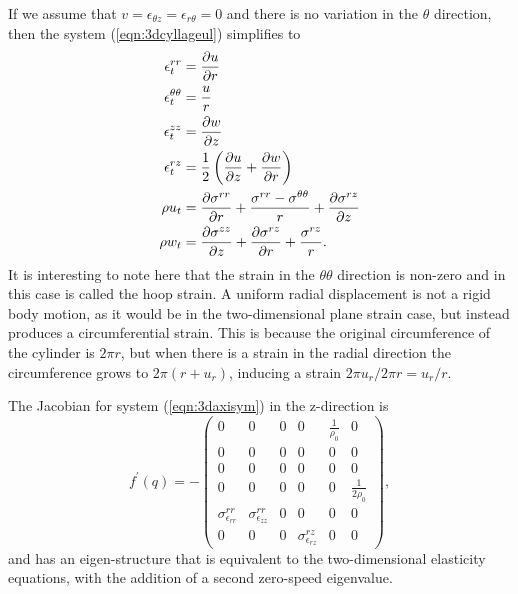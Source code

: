 \documentclass{article}
\begin{document}
If we assume that $v = \epsilon_{\theta z} = \epsilon_{r \theta} = 0$ and there is no variation in the $\theta
$ direction, then the system (\ref{eqn:3dcyllageul}) simplifies to
\begin{align}
\epsilon^{rr}_t &= \frac{\partial u}{\partial r}\notag\\
\epsilon^{\theta \theta}_t &= \frac{u}{r} \notag\\
\epsilon^{zz}_t &= \frac{\partial w}{\partial z}\notag\\
\epsilon^{rz}_t &= \frac{1}{2}\left(\frac{\partial u}{\partial z} + \frac{\partial w}{\partial r}\right)\label{eqn:3daxisym}\\
\rho u_t &= \frac{\partial \sigma^{rr}}{\partial r} + \frac{\sigma^{rr} - \sigma^{\theta \theta}}{r} + \frac{\partial 
\sigma^{rz}}{\partial z}\notag\\
\rho w_t &= \frac{\partial \sigma^{zz}}{\partial z} + \frac{\partial \sigma^{rz}}{\partial r} + \frac{\sigma^{rz}}
{r}.\notag
\end{align}
It is interesting to note here that the strain in the $\theta \theta$ direction is non-zero and in this case is 
called the hoop strain.  A uniform radial displacement is not a rigid body motion, as it would be in the 
two-dimensional plane strain case, but instead produces a circumferential strain.  This is because the 
original circumference of the cylinder is $2\pi r$, but when there is a strain in the radial direction the 
circumference grows to $2\pi (r + u_r)$, inducing a strain $2\pi u_r / 2 \pi r = u_r/r$.  


The Jacobian for system (\ref{eqn:3daxisym}) in the z-direction is
\begin{equation}
f^{\prime}(q) = -\left(
\begin{array}{cccccc} 0&0&0&0&\frac{1}{\rho_0}&0 \\ 0&0&0&0&0&0 \\ 0&0&0&0&0&0 \\ 0&0&0&0&0&\frac{1}{2\rho_0} \\ 
\sigma^{rr}_{\epsilon_{rr}}&\sigma^{rr}_{\epsilon_{zz}}&0&0&0&0\\ 0&0&0&
\sigma^{rz}_{\epsilon_{rz}}&0&0
\end{array}
\right), 
\end{equation}
and has an eigen-structure that is equivalent to the two-dimensional elasticity equations, with the 
addition of a second zero-speed eigenvalue.  
\end{document}
